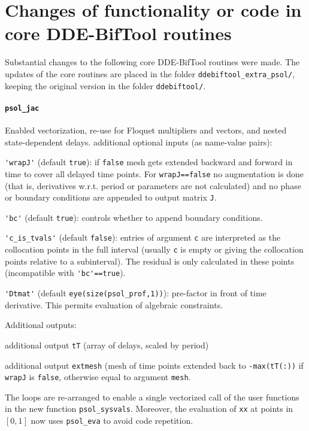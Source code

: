 \documentclass[11pt]{scrartcl}
\newcommand{\mlvar}[1]{\lstinline[keywordstyle=\color{var}]!#1!}
\newcommand{\blist}[1]{\mbox{\lstinline!#1!}}
\begin{document}
\section{Changes of functionality or code in core DDE-BifTool
  routines}
\label{sec:corechanges}
Substantial changes to the following core DDE-BifTool routines were
made. The updates of the core routines are placed in the folder
\texttt{ddebiftool\_extra\_psol/}, keeping the original version in the
folder \texttt{ddebiftool/}.

\paragraph{\blist{psol_jac}}
Enabled vectorization, re-use for Floquet multipliers and vectors, and
nested state-dependent delays. additional optional inputs (as
name-value pairs):
\begin{compactitem}
\item \blist{'wrapJ'} (default \blist{true}): if \blist{false} mesh
  gets extended backward and forward in time to cover all delayed time
  points. For \blist{wrapJ==false} no augmentation is done (that is,
  derivatives w.r.t. period or parameters are not calculated) and no
  phase or boundary conditions are appended to output matrix
  \mlvar{J}.
\item \blist{'bc'} (default \blist{true}): controls whether to append
  boundary conditions.
\item \blist{'c_is_tvals'} (default \blist{false}): entries of
  argument \blist{c} are interpreted as the collocation points in the
  full interval (usually \blist{c} is empty or giving the collocation
  points relative to a subinterval). The residual is only calculated
  in these points (incompatible with \blist{'bc'==true}).
\item \blist{'Dtmat'} (default \blist{eye(size(psol_prof,1))}):
  pre-factor in front of time derivative. This permits evaluation of
  algebraic constraints.
\end{compactitem}
Additional outputs:
\begin{compactitem}
\item additional output \mlvar{tT} (array of delays, scaled by period)
\item additional output \mlvar{extmesh} (mesh of time points extended
  back to \blist{-max(tT(:))} if \blist{wrapJ} is \blist{false},
  otherwise equal to argument \blist{mesh}.
\end{compactitem}
The loops are re-arranged to enable a single vectorized call of the
user functions in the new function \mlvar{psol_sysvals}. Moreover, the
evaluation of \blist{xx} at points in $[0,1]$ now uses
\blist{psol_eva} to avoid code repetition.
\end{document}
